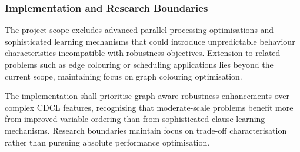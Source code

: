 \subsubsection{Implementation and Research Boundaries}
The project scope excludes advanced parallel processing optimisations and sophisticated learning mechanisms that could introduce unpredictable behaviour characteristics incompatible with robustness objectives. Extension to related problems such as edge colouring or scheduling applications lies beyond the current scope, maintaining focus on graph colouring optimisation.

The implementation shall prioritise graph-aware robustness enhancements over complex CDCL features, recognising that moderate-scale problems benefit more from improved variable ordering than from sophisticated clause learning mechanisms. Research boundaries maintain focus on trade-off characterisation rather than pursuing absolute performance optimisation.